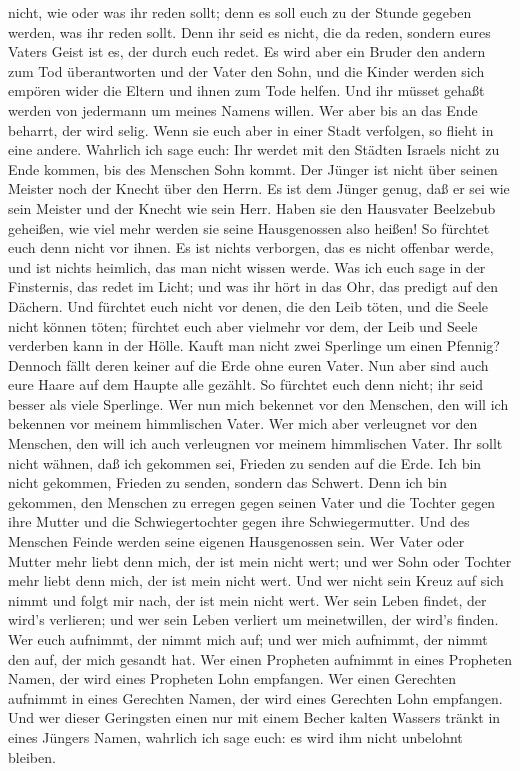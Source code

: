 nicht, wie oder was ihr reden sollt; denn es soll euch zu der Stunde
gegeben werden, was ihr reden sollt.  Denn ihr seid es
nicht, die da reden, sondern eures Vaters Geist ist es, der durch euch
redet.  Es wird aber ein Bruder den andern zum Tod
überantworten und der Vater den Sohn, und die Kinder werden sich empören
wider die Eltern und ihnen zum Tode helfen.  Und ihr müsset
gehaßt werden von jedermann um meines Namens willen. Wer aber bis an das
Ende beharrt, der wird selig.  Wenn sie euch aber in einer
Stadt verfolgen, so flieht in eine andere. Wahrlich ich sage euch: Ihr
werdet mit den Städten Israels nicht zu Ende kommen, bis des Menschen
Sohn kommt.  Der Jünger ist nicht über seinen Meister noch
der Knecht über den Herrn.  Es ist dem Jünger genug, daß er
sei wie sein Meister und der Knecht wie sein Herr. Haben sie den
Hausvater Beelzebub geheißen, wie viel mehr werden sie seine
Hausgenossen also heißen!  So fürchtet euch denn nicht vor
ihnen. Es ist nichts verborgen, das es nicht offenbar werde, und ist
nichts heimlich, das man nicht wissen werde.  Was ich euch
sage in der Finsternis, das redet im Licht; und was ihr hört in das Ohr,
das predigt auf den Dächern.  Und fürchtet euch nicht vor
denen, die den Leib töten, und die Seele nicht können töten; fürchtet
euch aber vielmehr vor dem, der Leib und Seele verderben kann in der
Hölle.  Kauft man nicht zwei Sperlinge um einen Pfennig?
Dennoch fällt deren keiner auf die Erde ohne euren Vater. 
Nun aber sind auch eure Haare auf dem Haupte alle gezählt. 
So fürchtet euch denn nicht; ihr seid besser als viele Sperlinge.
 Wer nun mich bekennet vor den Menschen, den will ich
bekennen vor meinem himmlischen Vater.  Wer mich aber
verleugnet vor den Menschen, den will ich auch verleugnen vor meinem
himmlischen Vater.  Ihr sollt nicht wähnen, daß ich
gekommen sei, Frieden zu senden auf die Erde. Ich bin nicht gekommen,
Frieden zu senden, sondern das Schwert.  Denn ich bin
gekommen, den Menschen zu erregen gegen seinen Vater und die Tochter
gegen ihre Mutter und die Schwiegertochter gegen ihre Schwiegermutter.
 Und des Menschen Feinde werden seine eigenen Hausgenossen
sein.  Wer Vater oder Mutter mehr liebt denn mich, der ist
mein nicht wert; und wer Sohn oder Tochter mehr liebt denn mich, der ist
mein nicht wert.  Und wer nicht sein Kreuz auf sich nimmt
und folgt mir nach, der ist mein nicht wert.  Wer sein
Leben findet, der wird's verlieren; und wer sein Leben verliert um
meinetwillen, der wird's finden.  Wer euch aufnimmt, der
nimmt mich auf; und wer mich aufnimmt, der nimmt den auf, der mich
gesandt hat.  Wer einen Propheten aufnimmt in eines
Propheten Namen, der wird eines Propheten Lohn empfangen. Wer einen
Gerechten aufnimmt in eines Gerechten Namen, der wird eines Gerechten
Lohn empfangen.  Und wer dieser Geringsten einen nur mit
einem Becher kalten Wassers tränkt in eines Jüngers Namen, wahrlich ich
sage euch: es wird ihm nicht unbelohnt bleiben.

